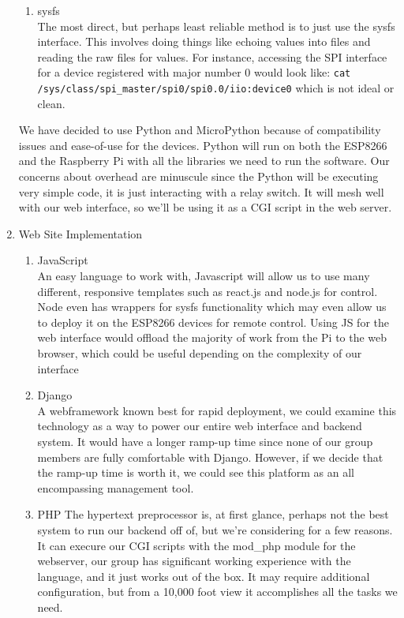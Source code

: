 \documentclass[12pt]{article}
\begin{document}
\begin{enumerate}
\begin{enumerate}
            \item sysfs \\
            The most direct, but perhaps least reliable method is to just use the sysfs interface. This involves doing things like echoing values into files and reading the raw files for values. For instance, accessing the SPI interface for a device registered with major number 0 would look like: \verb|cat /sys/class/spi_master/spi0/spi0.0/iio:device0| which is not ideal or clean.
        \end{enumerate}
        We have decided to use Python and MicroPython because of compatibility issues and ease-of-use for the devices. Python will run on both the ESP8266 and the Raspberry Pi with all the libraries we need to run the software. Our concerns about overhead are minuscule since the Python will be executing very simple code, it is just interacting with a relay switch. It will mesh well with our web interface, so we'll be using it as a CGI script in the web server.
    \item Web Site Implementation
        \begin{enumerate}
            \item JavaScript \\
            An easy language to work with, Javascript will allow us to use many different, responsive templates such as react.js and node.js for control. Node even has wrappers for sysfs functionality which may even allow us to deploy it on the ESP8266 devices for remote control. Using JS for the web interface would offload the majority of work from the Pi to the web browser, which could be useful depending on the complexity of our interface
            \item Django \\
            A webframework known best for rapid deployment, we could examine this technology as a way to power our entire web interface and backend system. It would have a longer ramp-up time since none of our group members are fully comfortable with Django. However, if we decide that the ramp-up time is worth it, we could see this platform as an all encompassing management tool. 
            \item PHP
            The hypertext preprocessor is, at first glance, perhaps not the best system to run our backend off of, but we're considering for a few reasons. It can execure our CGI scripts with the mod\_php module for the webserver, our group has significant working experience with the language, and it just works out of the box. It may require additional configuration, but from a 10,000 foot view it accomplishes all the tasks we need.

\end{enumerate}
\end{enumerate}
\end{document}
